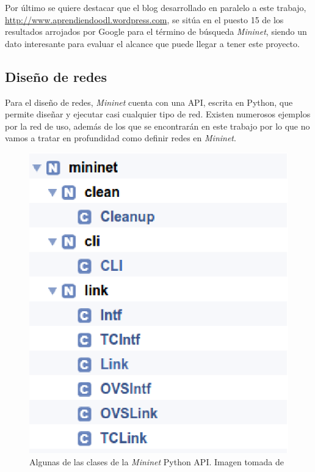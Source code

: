 \documentclass[a4paper,11pt]{book}
\begin{document}
Por último se quiere destacar que el blog desarrollado en paralelo a este trabajo, \url{http://www.aprendiendoodl.wordpress.com}, se sitúa en el puesto 15 de los resultados arrojados por Google para el término de búsqueda \emph{Mininet}, siendo un dato interesante para evaluar el alcance que puede llegar a tener este proyecto.

\subsection{Diseño de redes}\label{pythonapi}
Para el diseño de redes, \emph{Mininet} cuenta con una \ac{API}\cite{mininetAPI}, escrita en Python, que permite diseñar y ejecutar casi cualquier tipo de red. Existen numerosos ejemplos por la red de uso, además de los que se encontrarán en este trabajo por lo que no vamos a tratar en profundidad como definir redes en \emph{Mininet}. 

\begin{figure}
\centering
\includegraphics[scale=0.8]{./figuras/mininetAPI}
\caption[Ejemplo clases Python]{Algunas de las clases de la \emph{Mininet} Python \ac{API}. Imagen tomada de \cite{mininetAPI}}\label{pythonAPI}
\end{figure}
\end{document}
